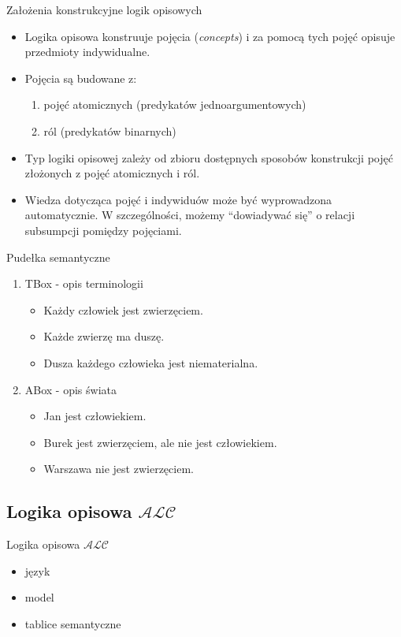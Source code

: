 \documentclass{beamer}
\begin{document}
\begin{frame}{Założenia konstrukcyjne logik opisowych}
%
\begin{itemize}
\item Logika opisowa konstruuje pojęcia (\emph{concepts}) i za pomocą tych pojęć opisuje przedmioty indywidualne.
%
\item Pojęcia są budowane z:
\begin{enumerate}
\item pojęć atomicznych (predykatów jednoargumentowych)
\item ról (predykatów binarnych)
\end{enumerate}
%
\item Typ logiki opisowej zależy od zbioru dostępnych sposobów konstrukcji pojęć złożonych z pojęć atomicznych i ról.
%
\item Wiedza dotycząca pojęć i indywiduów może być wyprowadzona automatycznie. W szczególności, możemy ``dowiadywać się'' o relacji subsumpcji pomiędzy pojęciami.
\end{itemize}
\end{frame}

\begin{frame}{Pudełka semantyczne}
%
\begin{enumerate}
\item TBox - opis terminologii
\begin{itemize}
\item Każdy człowiek jest zwierzęciem.
\item Każde zwierzę ma duszę.
\item Dusza każdego człowieka jest niematerialna.
\end{itemize}
%
\item ABox - opis świata
\begin{itemize}
\item Jan jest człowiekiem.
\item Burek jest zwierzęciem, ale nie jest człowiekiem.
\item Warszawa nie jest zwierzęciem.
\end{itemize}
\end{enumerate}
\end{frame}

\subsection{Logika opisowa $\mathcal{ALC}$}

\begin{frame}{Logika opisowa $\mathcal{ALC}$}
%
\begin{itemize}
\item język
\item model
\item tablice semantyczne
\end{itemize}
\end{frame}
\end{document}
